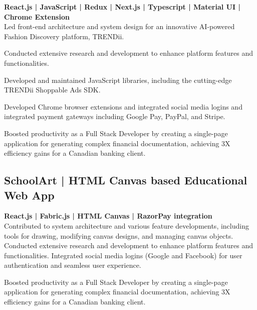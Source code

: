\documentclass[letterpaper]{deedy-resume} %
\begin{document}
\begin{minipage}[t]{0.66\textwidth}
\textbf{React.js | JavaScript | Redux | Next.js | Typescript | Material UI | Chrome Extension} \\
Led front-end architecture and system design for an innovative AI-powered Fashion Discovery platform, TRENDii.

Conducted extensive research and development to enhance platform features and functionalities.

Developed and maintained JavaScript libraries, including the cutting-edge TRENDii Shoppable Ads SDK.

Developed Chrome browser extensions and integrated social media logins and integrated payment gateways including Google Pay, PayPal, and Stripe.

Boosted productivity as a Full Stack Developer by creating a single-page application for generating complex financial documentation, achieving 3X efficiency gains for a Canadian banking client.

\sectionspace %



\subsection{SchoolArt | HTML Canvas based Educational Web App}


\textbf{React.js | Fabric.js | HTML Canvas | RazorPay integration} \\

Contributed to system architecture and various feature developments, including tools for drawing, modifying canvas designs, and managing canvas objects.
Conducted extensive research and development to enhance platform features and functionalities.
Integrated social media logins (Google and Facebook) for user authentication and seamless user experience.

Boosted productivity as a Full Stack Developer by creating a single-page application for generating complex financial documentation, achieving 3X efficiency gains for a Canadian banking client.

\sectionspace %




\end{minipage} %

\end{document}
